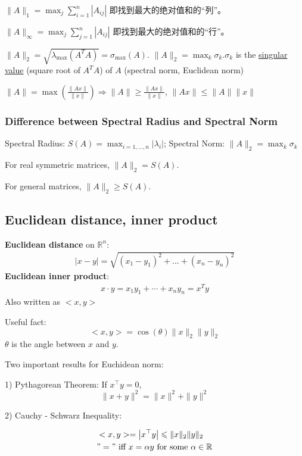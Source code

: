\documentclass[11pt,a4paper]{article}
\begin{document}
$\|A\|_{1}=\max _{j} \sum_{i=1}^{n}\left|A_{i j}\right|$ 即找到最大的绝对值和的“列”。

$\|A\|_{\infty}=\max _{j} \sum_{j=1}^{n}\left|A_{i j}\right|$ 即找到最大的绝对值和的“行”。

${\displaystyle \|A\|_{2}={\sqrt {\lambda _{\max }\left(A^{T}A\right)}}=\sigma _{\max }(A).}$
$\|A\|_{2}=\max _{k} \sigma_{k}. \sigma_{k}$ is the \underline{singular value} (square root of $A^TA$) of $A$ (spectral norm, Euclidean norm)

$\|A\|=\max \left(\frac{\|A x\|}{\|x\|}\right) \Rightarrow\|A\| \geqslant \frac{\|A x\|}{\|x\|}$, $\|Ax\| \leqslant\|A\|\|x\|$

\subsubsection{Difference between Spectral Radius and Spectral Norm}
Spectral Radius: $S(A)=\max_{i=1,...,n}|\lambda_i|$; Spectral Norm: $\|A\|_{2}=\max _{k} \sigma_{k}$

For real symmetric matrices, $\|A\|_2=S(A)$.

For general matrices, $\|A\|_2\geq S(A)$.

\subsection{ Euclidean distance, inner product}
\textbf{Euclidean distance} on $\mathbb{R}^n$:
\begin{equation}
    \begin{aligned}
        |x-y|=\sqrt{(x_1-y_1)^2+...+(x_n-y_n)^2}
    \end{aligned}
    \nonumber
\end{equation}
\textbf{Euclidean inner product}:
\begin{equation}
    \begin{aligned}
        x\cdot y=x_1y_1+\cdots +x_ny_n=x^Ty
    \end{aligned}
    \nonumber
\end{equation}
Also written as $<x,y>$

Useful fact: $$<x,y>=\cos(\theta)\|x\|_2\|y\|_2$$
$\theta$ is the angle between $x$ and $y$.

Two important results for Euchidean norm:

1) Pythagorean Theorem: If $x^{\top} y=0$,
\[ \|x+y\|^{2}=\|x\|^{2}+\|y\|^{2} \]

2) Cauchy - Schwarz Inequality:

$$
\begin{aligned}
&<x,y>=\left|x^{\top} y\right| \leqslant\|x\|_2\|y\|_2 \\
&"=" \text { iff } x=\alpha y \text { for some } \alpha \in \mathbb{R}
\end{aligned}
$$
\end{document}
